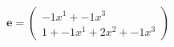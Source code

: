 \documentclass[preview]{standalone}
\begin{document}
\begin{align*}
\mathbf{e} = \begin{pmatrix}-1x^{1} + -1x^{3} \\ 1 + -1x^{1} + 2x^{2} + -1x^{3}\end{pmatrix}
\end{align*}
\end{document}
